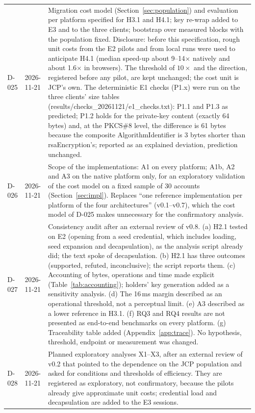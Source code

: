 \documentclass[11pt,a4paper]{article}
\begin{document}
\begin{longtable}{l l p{11.5cm}}
D-025 & 2026-11-21 & Migration cost model (Section~\ref{sec:population}) and evaluation per platform specified for H3.1 and H4.1; key re-wrap added to E3 and to the three clients; bootstrap over measured blocks with the population fixed. Disclosure: before this specification, rough unit costs from the E2 pilots and from local runs were used to anticipate H4.1 (median speed-up about 9--14$\times$ natively and about 1.6$\times$ in browsers). The threshold of $10\times$ and the direction, registered before any pilot, are kept unchanged; the cost unit is JCP's own. The deterministic E1 checks (P1.x) were run on the three clients' size tables (results/checks\_20261121/e1\_checks.txt): P1.1 and P1.3 as predicted; P1.2 holds for the private-key content (exactly 64 bytes) and, at the PKCS\#8 level, the difference is 61 bytes because the composite AlgorithmIdentifier is 3 bytes shorter than rsaEncryption's; reported as an explained deviation, prediction unchanged.\\
D-026 & 2026-11-21 & Scope of the implementations: A1 on every platform; A1b, A2 and A3 on the native platform only, for an exploratory validation of the cost model on a fixed sample of 30 accounts (Section~\ref{sec:impl}). Replaces ``one reference implementation per platform of the four architectures'' (v0.1--v0.7), which the cost model of D-025 makes unnecessary for the confirmatory analysis.\\
D-027 & 2026-11-21 & Consistency audit after an external review of v0.8. (a) H2.1 tested on E2 (opening from a seed credential, which includes loading, seed expansion and decapsulation), as the analysis script already did; the text spoke of decapsulation. (b) H2.1 has three outcomes (supported, refuted, inconclusive); the script reports them. (c) Accounting of bytes, operations and time made explicit (Table~\ref{tab:accounting}); holders' key generation added as a sensitivity analysis. (d) The 16\,ms margin described as an operational threshold, not a perceptual limit. (e) A3 described as a lower reference in H3.1. (f) RQ3 and RQ4 results are not presented as end-to-end benchmarks on every platform. (g) Traceability table added (Appendix~\ref{app:trace}). No hypothesis, threshold, endpoint or measurement was changed.\\
D-028 & 2026-11-21 & Planned exploratory analyses X1--X3, after an external review of v0.2 that pointed to the dependence on the JCP population and asked for conditions and thresholds of efficiency. They are registered as exploratory, not confirmatory, because the pilots already give approximate unit costs; credential load and decapsulation are added to the E3 sessions.\\

\end{longtable}
\end{document}
